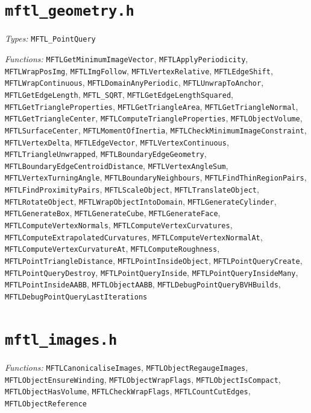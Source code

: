 \section*{\texttt{mftl\_geometry.h}}
\textit{Types:} \texttt{MFTL\_PointQuery}\par
\textit{Functions:} \texttt{MFTLGetMinimumImageVector}, \texttt{MFTLApplyPeriodicity}, \texttt{MFTLWrapPosImg}, \texttt{MFTLImgFollow}, \texttt{MFTLVertexRelative}, \texttt{MFTLEdgeShift}, \texttt{MFTLWrapContinuous}, \texttt{MFTLDomainAnyPeriodic}, \texttt{MFTLUnwrapToAnchor}, \texttt{MFTLGetEdgeLength}, \texttt{MFTL\_SQRT}, \texttt{MFTLGetEdgeLengthSquared}, \texttt{MFTLGetTriangleProperties}, \texttt{MFTLGetTriangleArea}, \texttt{MFTLGetTriangleNormal}, \texttt{MFTLGetTriangleCenter}, \texttt{MFTLComputeTriangleProperties}, \texttt{MFTLObjectVolume}, \texttt{MFTLSurfaceCenter}, \texttt{MFTLMomentOfInertia}, \texttt{MFTLCheckMinimumImageConstraint}, \texttt{MFTLVertexDelta}, \texttt{MFTLEdgeVector}, \texttt{MFTLVertexContinuous}, \texttt{MFTLTriangleUnwrapped}, \texttt{MFTLBoundaryEdgeGeometry}, \texttt{MFTLBoundaryEdgeCentroidDistance}, \texttt{MFTLVertexAngleSum}, \texttt{MFTLVertexTurningAngle}, \texttt{MFTLBoundaryNeighbours}, \texttt{MFTLFindThinRegionPairs}, \texttt{MFTLFindProximityPairs}, \texttt{MFTLScaleObject}, \texttt{MFTLTranslateObject}, \texttt{MFTLRotateObject}, \texttt{MFTLWrapObjectIntoDomain}, \texttt{MFTLGenerateCylinder}, \texttt{MFTLGenerateBox}, \texttt{MFTLGenerateCube}, \texttt{MFTLGenerateFace}, \texttt{MFTLComputeVertexNormals}, \texttt{MFTLComputeVertexCurvatures}, \texttt{MFTLComputeExtrapolatedCurvatures}, \texttt{MFTLComputeVertexNormalAt}, \texttt{MFTLComputeVertexCurvatureAt}, \texttt{MFTLComputeRoughness}, \texttt{MFTLPointTriangleDistance}, \texttt{MFTLPointInsideObject}, \texttt{MFTLPointQueryCreate}, \texttt{MFTLPointQueryDestroy}, \texttt{MFTLPointQueryInside}, \texttt{MFTLPointQueryInsideMany}, \texttt{MFTLPointInsideAABB}, \texttt{MFTLObjectAABB}, \texttt{MFTLDebugPointQueryBVHBuilds}, \texttt{MFTLDebugPointQueryLastIterations}\par

\section*{\texttt{mftl\_images.h}}
\textit{Functions:} \texttt{MFTLCanonicaliseImages}, \texttt{MFTLObjectRegaugeImages}, \texttt{MFTLObjectEnsureWinding}, \texttt{MFTLObjectWrapFlags}, \texttt{MFTLObjectIsCompact}, \texttt{MFTLObjectHasVolume}, \texttt{MFTLCheckWrapFlags}, \texttt{MFTLCountCutEdges}, \texttt{MFTLObjectReference}\par

